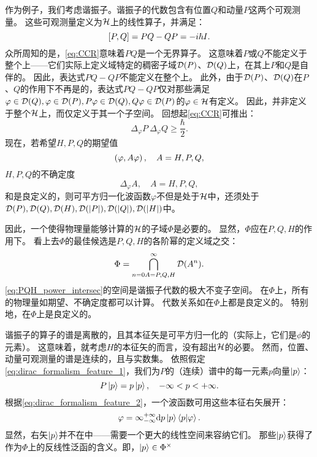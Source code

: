 作为例子，我们考虑谐振子。谐振子的代数包含有位置\(Q\)和动量\(P\)这两个可观测量。
这些可观测量定义为\(\mathcal H\)上的线性算子，并满足\ccr：
\[\label{eq:CCR}
	\left[P,Q\right]= PQ-QP=-i\hbar I.\]
众所周知的是，\cref{eq:CCR}意味着\(P\)\(Q\)是一个无界算子。
这意味着\(P\)或\(Q\)不能定义于整个\hs 上——它们实际上定义域特定的稠密子域\(\mathcal D(P)\)、\(\mathcal D(Q)\)上，在其上\(P\)和\(Q\)是自伴的。
因此，表达式\(PQ-QP\)不能定义在整个\hs 上。
此外，由于\(\mathcal D(P)\)、\(\mathcal D(Q)\)在\(P\)、\(Q\)的作用下不再是的，表达式\(PQ-QP\)仅对那些满足\(\varphi\in\mathcal D(Q),\varphi\in\mathcal D(P),P\varphi\in\mathcal D(Q),Q\varphi\in\mathcal D(P)\)的\(\varphi\in\mathcal H\)有定义。
因此，并非定义于整个\(\mathcal H\)上，而仅定义于其一个子空间。
回想起\cref{eq:CCR}可推出\hur：
\[\label{eq:HUR}
	\Delta_\varphi P\ \Delta_\varphi Q\geq\frac{\hbar}{2}.\]
现在，若希望\(H,P,Q\)的期望值
\[\left(\varphi,A\varphi\right),\quad A=H,P,Q,\]
\(H,P,Q\)的不确定度
\[\label{eq:uncertainty_HPQ}
	\Delta_\varphi A,\quad A=H,P,Q,\]
和是良定义的，则可平方归一化波函数\(\varphi\)不但是处于\(\mathcal H\)中，还须处于\(\mathcal D(P),\mathcal D(Q),\mathcal D(H),\mathcal D(|P|),\mathcal D(|Q|),\mathcal D(|H|)\)中。

因此，一个使得物理量能够计算的\(\mathcal H\)的子域\(\Phi\)是必要的。
显然，\(\Phi\)应在\(P,Q,H\)的作用下。
看上去\(\Phi\)的最佳候选是\(P,Q,H\)的各阶幂的定义域之交：
\[\label{eq:PQH_power_intersec}
	\Phi=\bigcap_{n=0\\A=P,Q,H}^\infty\mathcal D(A^n).\]
\cref{eq:PQH_power_intersec}的空间是谐振子代数的极大不变子空间。
在\(\Phi\)上，所有的物理量如期望、不确定度都可以计算。
代数关系如\ccr 在\(\Phi\)上都是良定义的。
特别地，\hur 在\(\Phi\)上是良定义的。

谐振子的\hamilton 算子的谱是离散的，且其本征矢是可平方归一化的（实际上，它们是\(\phi\)的元素）。
这意味着，就考虑\(H\)的本征矢的而言，没有超出\hs \(\mathcal H\)的必要。
然而，位置、动量可观测量的谱是连续的，且与实数集。
依照假定\cref{eq:dirac_formalism_feature_1}，我们为\(P\)的（连续）谱中的每一元素\(p\)向量\(\ket p\)：
\[P\ket p=p\ket p,\quad -\infty<p<+\infty.\]
根据\cref{eq:dirac_formalism_feature_2}，一个波函数可用这些本征右矢展开：
\[\varphi=\infty_{-\infty}^{+\infty}{\mathrm d} p\ket p\braket{p|\varphi}.\]
显然，右矢\(\ket p\)并不在\hs 中——需要一个更大的线性空间来容纳它们。
那些\(\ket p\)获得了作为\(\Phi\)上的反线性泛函的含义。即，\(\ket p\in\Phi^\times\)
